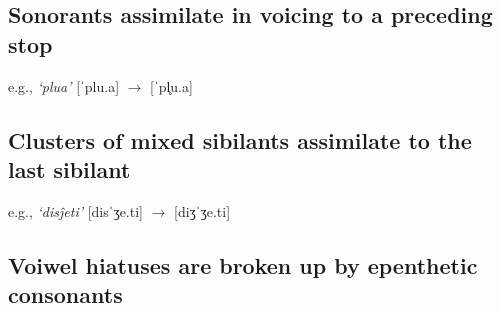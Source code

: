 \documentclass[a4paper,11pt,article,oneside]{memoir}
\newcommand{\bripa}[1]{[#1]}
\newcommand{\espq}[1]{\textit{`#1'}}
\newcommand{\ezh}{ʒ}
\newcommand{\vless}{̥}
\newcommand{\prstr}{ˈ}
\begin{document}
\subsection{Sonorants assimilate in voicing to a preceding stop}

e.g., \espq{plua} \bripa{\prstr plu.a} $\to$ \bripa{\prstr pl\vless u.a}

\subsection{Clusters of mixed sibilants assimilate to the last sibilant}

e.g., \espq{dis\^{j}eti} \bripa{dis\prstr\ezh e.ti} $\to$ \bripa{di\ezh\prstr\ezh e.ti}

\subsection{Voiwel hiatuses are broken up by epenthetic consonants}
\end{document}
